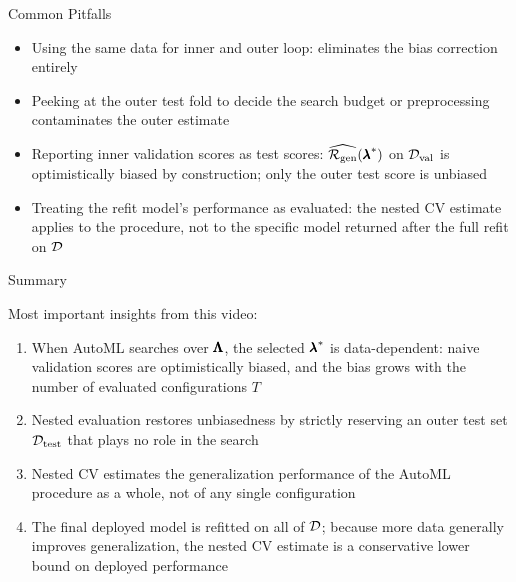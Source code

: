 \documentclass[main]{subfiles}
\begin{document}
\begin{frame}{Common Pitfalls}
    \begin{itemize}
        \item Using the same data for inner and outer loop: eliminates the bias correction entirely
        \item Peeking at the outer test fold to decide the search budget or preprocessing contaminates the outer estimate
        \item Reporting inner validation scores as test scores: $\widehat{\mathcal{R}_{\text{gen}}}({\pmb{\lambda}}^*)$ on $\mathcal{D}_{\text{val}}$ is optimistically biased by construction; only the outer test score is unbiased
        \item Treating the refit model's performance as evaluated: the nested CV estimate applies to the procedure, not to the specific model returned after the full refit on $\mathcal{D}$
    \end{itemize}
\end{frame}

\begin{frame}{Summary} 

Most important insights from this video:

\begin{enumerate}
    \item When AutoML searches over $\pmb{\Lambda}$, the selected ${\pmb{\lambda}}^*$ is data-dependent: naive validation scores are optimistically biased, and the bias grows with the number of evaluated configurations $T$
    \item Nested evaluation restores unbiasedness by strictly reserving an outer test set $\mathcal{D}_{\text{test}}$ that plays no role in the search
    \item Nested CV estimates the generalization performance of the AutoML procedure as a whole, not of any single configuration
    \item The final deployed model is refitted on all of $\mathcal{D}$; because more data generally improves generalization, the nested CV estimate is a conservative lower bound on deployed performance
\end{enumerate}

\end{frame}
\end{document}
